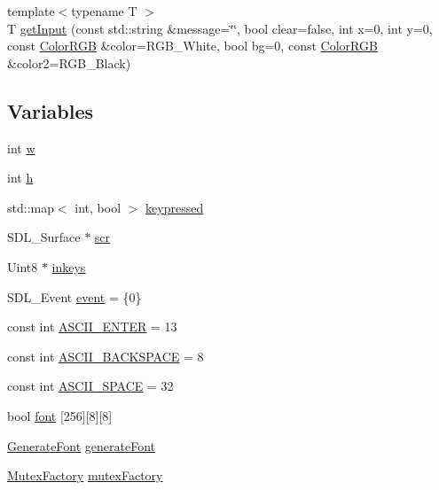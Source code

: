 \begin{DoxyCompactItemize}
\item 
{\footnotesize template$<$typename T $>$ }\\T \hyperlink{namespaceQuickCG_a060284f149586fc828dc3b69b4ed192e}{get\-Input} (const std\-::string \&message=\char`\"{}\char`\"{}, bool clear=false, int x=0, int y=0, const \hyperlink{structQuickCG_1_1ColorRGB}{Color\-R\-G\-B} \&color=R\-G\-B\-\_\-\-White, bool bg=0, const \hyperlink{structQuickCG_1_1ColorRGB}{Color\-R\-G\-B} \&color2=R\-G\-B\-\_\-\-Black)
\end{DoxyCompactItemize}
\subsection*{Variables}
\begin{DoxyCompactItemize}
\item 
int \hyperlink{namespaceQuickCG_aee0a81fa45305d0058f5270e1acd6356}{w}
\item 
int \hyperlink{namespaceQuickCG_ae460032287c9d51b4883aa9a6d7906ab}{h}
\item 
std\-::map$<$ int, bool $>$ \hyperlink{namespaceQuickCG_afeaf9bfd3381e8615f172e026420afee}{keypressed}
\item 
S\-D\-L\-\_\-\-Surface $\ast$ \hyperlink{namespaceQuickCG_a69ab27a13de5285d506fab8d5cf51f86}{scr}
\item 
Uint8 $\ast$ \hyperlink{namespaceQuickCG_ad8b8e937433a800f9bd0bf81faff4312}{inkeys}
\item 
S\-D\-L\-\_\-\-Event \hyperlink{namespaceQuickCG_a11407295e1307c55e0db667e09055365}{event} = \{0\}
\item 
const int \hyperlink{namespaceQuickCG_a653347727493ee70ad64734222449ab6}{A\-S\-C\-I\-I\-\_\-\-E\-N\-T\-E\-R} = 13
\item 
const int \hyperlink{namespaceQuickCG_a1471d38830e46d9549694c38f89f2a33}{A\-S\-C\-I\-I\-\_\-\-B\-A\-C\-K\-S\-P\-A\-C\-E} = 8
\item 
const int \hyperlink{namespaceQuickCG_ab7680b1029dfc3e65d17e184d26698c5}{A\-S\-C\-I\-I\-\_\-\-S\-P\-A\-C\-E} = 32
\item 
bool \hyperlink{namespaceQuickCG_a82a95aabb0ab79dafa6c2409d0718434}{font} \mbox{[}256\mbox{]}\mbox{[}8\mbox{]}\mbox{[}8\mbox{]}
\item 
\hyperlink{structQuickCG_1_1GenerateFont}{Generate\-Font} \hyperlink{namespaceQuickCG_a6d5d49731a3a613a4940d2f0b22a2c55}{generate\-Font}
\item 
\hyperlink{structQuickCG_1_1MutexFactory}{Mutex\-Factory} \hyperlink{namespaceQuickCG_aeaff2ca660279a53258f4868679c69f8}{mutex\-Factory}

\end{DoxyCompactItemize}
